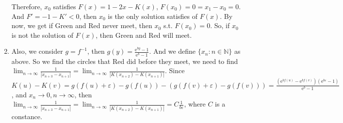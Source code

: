 \documentclass{ctexart}
\begin{document}
\begin{solution}
\begin{enumerate}
      Therefore, \(x_0\) satisfies \(F(x)=1-2x-K(x)\), \(F(x_0)=0=x_1-x_0=0\). And \(F'=-1-K'<0\), then \(x_0\) is
      the only solution satisfies of \(F(x)\).
      By now, we get if Green and Red never meet, then \(x_0\) s.t. \(F(x_0)=0\).
      So, if \(x_0\) is not the solution of \(F(x)\), then Green and Red will meet.
    \item Also, we consider \(g=f^{-1}\), then \(g(y)=\frac{\mathrm{e}^{by}-1}{\mathrm{e}^b-1}\).
      And we define \(\{x_n:n \in \mathbb{N}\}\) as above.
      So we find the circles that Red did before they meet, we need to find \(\lim_{n \to \infty} \frac{1}{|x_{n +3}-x_{n + 1}|}=\lim_{n \to \infty} \frac{1}{|K(x_{n + 2})-K(x_{n + 1})|}\).
      Since \(K(u)-K(v)=g(f(u) + \varepsilon)-g(f(u))-(g(f(v) + \varepsilon) -g(f(v)))=\frac{(\mathrm{e}^{bf(u)}-\mathrm{e}^{bf(v)})(\mathrm{e}^{b \varepsilon}-1)}{\mathrm{e}^b-1}\),
      and \(x_n \to 0, n \to \infty\), then \(\lim_{n \to \infty} \frac{1}{|x_{n +3}-x_{n + 1}|}=\lim_{n \to \infty} \frac{1}{|K(x_{n + 2})-K(x_{n + 1})|}=C \frac{1}{b \varepsilon}\),
      where \(C\) is a constance.
  \end{enumerate}
\end{solution}
\pagebreak
\end{document}
